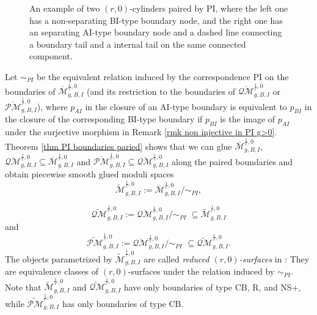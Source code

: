 \documentclass[11pt]{amsart}
\theoremstyle{definition}
\theoremstyle{remark}
\newcommand{\oPMb}{{\overline{\mathcal{PM}}}}
\newcommand{\oQMb}{{\overline{\mathcal{QM}}}}
\newcommand{\<}{\left<}
\renewcommand{\>}{\right>}
\numberwithin{equation}{section}
\def\Mbar{{\overline{\mathcal M}}}
\def\PI{{\text{PI}}}
\def\PI{\text{PI}}
\begin{document}
\begin{figure}
\begin{subfigure}{.45\textwidth}
\begin{tikzpicture}[scale=0.5]
\end{tikzpicture}
        \end{subfigure}
        \caption{An example of two $(r,0)$-cylinders paired by $\PI$, where the left one has a non-separating BI-type boundary node, and the right one has an separating AI-type %
boundary node and %
a dashed line connecting a boundary tail and a internal tail on the same connected component.}
        \label{fig point insertion at non separationg}
    \end{figure}
 

  Let $\sim_{PI}$ be the equivalent relation induced by the correspondence $\PI$ on the boundaries of $\Mbar^{\frac{1}{r},0}_{g,B,I}$ (and its restriction to the boundaries of $\oQMb^{\frac{1}{r},0}_{g,B,I}$ or $\oPMb^{\frac{1}{r},0}_{g,B,I}$), where $p_{AI}$ in the closure of an AI-type boundary is equivalent to $p_{BI}$ in the closure of the corresponding BI-type boundary if $p_{BI}$ is the image of $p_{AI}$ under the surjective morphism in Remark \ref{rmk non injective in PI g>0}. Theorem \ref{thm  PI boundaries paried} shows that we can glue $\Mbar^{\frac{1}{r},0}_{g,B,I}$, $\oQMb^{\frac{1}{r},0}_{g,B,I}\subseteq \Mbar^{\frac{1}{r},0}_{g,B,I}$ and $\oPMb^{\frac{1}{r},0}_{g,B,I}\subseteq \oQMb^{\frac{1}{r},0}_{g,B,I}$ along the paired boundaries and obtain piecewise smooth glued moduli %
spaces
    $$
    \widetilde{\mathcal M}^{\frac{1}{r},0}_{g,B,I}:=\Mbar^{\frac{1}{r},0}_{g,B,I}\big/\sim_{PI},
    $$
    
    $$
    \widetilde{\mathcal{QM}}^{\frac{1}{r},0}_{g,B,I}:=\overline{\mathcal{QM}}^{\frac{1}{r},0}_{g,B,I}\big/\sim_{PI} \,\, \subseteq \widetilde{\mathcal M}^{\frac{1}{r},0}_{g,B,I}
    $$
    and %
    $$
     \widetilde{\mathcal{PM}}^{\frac{1}{r},0}_{g,B,I}:=\overline{\mathcal{QM}}^{\frac{1}{r},0}_{g,B,I}\big/\sim_{PI} \,\,\subseteq \widetilde{\mathcal{QM}}^{\frac{1}{r},0}_{g,B,I}.
    $$
    The objects parametrized by $\widetilde{\mathcal M}^{\frac{1}{r},0}_{g,B,I}$  are called \textit{reduced $(r,0)$-surfaces} %
in \cite{TZ1}: They are %
equivalence classes of $(r,0)$-surfaces under the relation induced by $\sim_{PI}$. Note that $\widetilde{\mathcal M}^{\frac{1}{r},0}_{g,B,I}$ and $\widetilde{\mathcal {QM}}^{\frac{1}{r},0}_{g,B,I}$ have only boundaries of type CB, R, and NS+, while $\widetilde{\mathcal {PM}}^{\frac{1}{r},0}_{g,B,I}$ has only boundaries of type CB.
    
\end{document}
